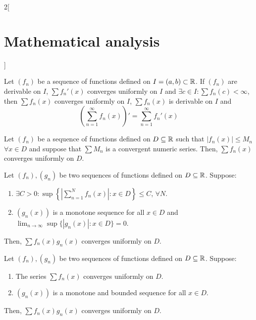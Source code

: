 \documentclass[../../../main.tex]{subfiles}
\begin{document}
\begin{multicols}{2}[\section{Mathematical analysis}]
  \begin{theorem}
    Let $(f_n)$ be a sequence of functions defined on $I=(a,b)\subset\mathbb{R} $. If $(f_n)$ are derivable on $I$, $\sum f_n'(x)$ converges uniformly on $I$ and $\exists c\in I:\sum f_n(c)<\infty$, then $\sum f_n(x)$ converges uniformly on $I$, $\sum f_n(x)$ is derivable on $I$ and $$\left(\sum_{n=1}^\infty f_n(x)\right)'=\sum_{n=1}^\infty f_n'(x)$$
  \end{theorem}
  \begin{theorem}
    Let $(f_n)$ be a sequence of functions defined on $D\subseteq\mathbb{R} $ such that $|f_n(x)|\leq M_n$ $\forall x\in D$ and suppose that $\sum M_n$ is a convergent numeric series. Then, $\sum f_n(x)$ converges uniformly on $D$.
  \end{theorem}
  \begin{theorem}
    Let $(f_n),(g_n)$ be two sequences of functions defined on $D\subseteq\mathbb{R} $. Suppose:
    \begin{enumerate}
      \item $\displaystyle\exists C>0: \sup\left\{\left|\sum_{n=1}^Nf_n(x)\right|:x\in D\right\}\leq C$, $\forall N$.
      \item $(g_n(x))$ is a monotone sequence for all $x\in D$ and $\displaystyle\lim_{n\to\infty}\sup\{|g_n(x)|:x\in D\}=0$.
    \end{enumerate}
    Then, $\sum f_n(x)g_n(x)$ converges uniformly on $D$.
  \end{theorem}
  \begin{theorem}
    Let $(f_n),(g_n)$ be two sequences of functions defined on $D\subseteq\mathbb{R} $. Suppose:
    \begin{enumerate}
      \item The series $\sum f_n(x)$ converges uniformly on $D$.
      \item $(g_n(x))$ is a monotone and bounded sequence for all $x\in D$.
    \end{enumerate}
    Then, $\sum f_n(x)g_n(x)$ converges uniformly on $D$.
  \end{theorem}

\end{multicols}
\end{document}
